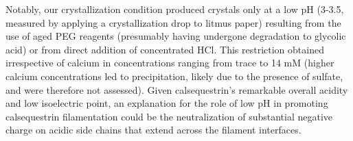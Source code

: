 Notably, our crystallization condition produced crystals only at a low pH (3-3.5, measured by applying a crystallization drop to litmus paper) resulting from the use of aged PEG reagents (presumably having undergone degradation to glycolic acid) or from direct addition of concentrated HCl. This restriction obtained irrespective of calcium in concentrations ranging from trace to 14 mM (higher calcium concentrations led to precipitation, likely due to the presence of sulfate, and were therefore not assessed). Given calsequestrin’s remarkable overall acidity and low isoelectric point, an explanation for the role of low pH in promoting calsequestrin filamentation could be the neutralization of substantial negative charge on acidic side chains that extend across the filament interfaces. %

